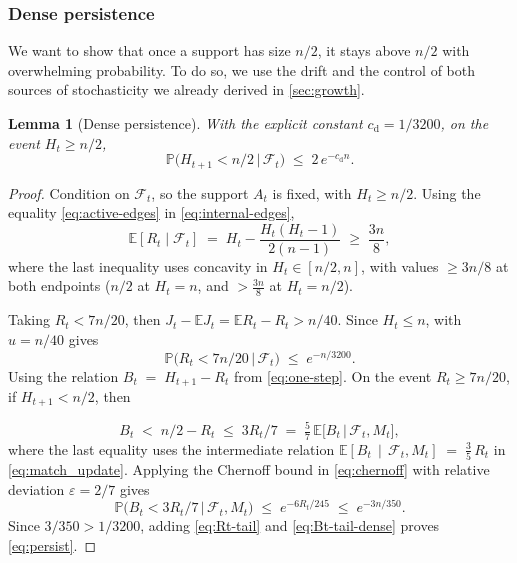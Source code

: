 \documentclass[
    aps,
    superscriptaddress,
    onecolumn,
    10pt,
    prx,
    nofootinbib
]{revtex4-2}
\newtheorem{lemma}{Lemma}
\theoremstyle{namedstatement}
\theoremstyle{plain}
\begin{document}
\subsubsection{Dense persistence}
We want to show that once a support has size $n/2$, it stays above $n/2$ with overwhelming probability. To do so, we use the drift and the control of both sources of stochasticity we already derived in \cref{sec:growth}.
\begin{lemma}[Dense persistence]\label{lem:dense-persistence}
With the explicit constant $c_{\mathrm d}=1/3200$, on the event $H_t\ge n/2$,
\begin{equation}\label{eq:persist}
  \mathbb P\big(H_{t+1}<n/2\,\big|\,\mathcal F_t\big)\;\le\;2\,e^{-c_{\mathrm d}n}.
\end{equation}
\end{lemma}

\begin{proof}
Condition on $\mathcal F_t$, so the support $A_t$ is fixed, with $H_t\ge n/2$. Using the equality \cref{eq:active-edges} in \cref{eq:internal-edges},
\begin{equation}\label{eq:ER-dense}
  \mathbb E[R_t\mid\mathcal F_t]\;=\;H_t-\frac{H_t(H_t-1)}{2(n-1)}\;\ge\;\frac{3n}{8},
\end{equation}
where the last inequality uses concavity in $H_t\in[n/2,n]$, with values $\ge 3n/8$ at
both endpoints ($n/2$ at $H_t=n$, and $>\tfrac{3n}{8}$ at $H_t=n/2$).

Taking $R_t<7n/20$, then $J_t-\mathbb EJ_t=\mathbb ER_t-R_t>n/40$. Since $H_t\le n$,
 with $u=n/40$ gives 
\begin{equation}\label{eq:Rt-tail}
  \mathbb P\big(R_t<7n/20\,\big|\,\mathcal F_t\big)\;\le\;e^{-n/3200}.
\end{equation}
Using the relation  $B_t \;=\; H_{t+1}-R_t$ from \cref{eq:one-step}. On the event $R_t\ge7n/20$, if  $H_{t+1}<n/2$, then

\begin{equation}
  B_t\;<\;n/2-R_t\;\le\;3R_t/7\;=\;\tfrac57\,\mathbb E\big[B_t\,\big|\,\mathcal F_t,M_t\big],
\end{equation}
where the last equality uses the intermediate relation $\mathbb{E}\!\left[ B_t \,\middle|\, \mathcal{F}_t, M_t \right]\;=\; \tfrac{3}{5}\, R_t$ in \cref{eq:match_update}. Applying the Chernoff bound in \cref{eq:chernoff} with relative deviation $\varepsilon=2/7$ gives
\begin{equation}\label{eq:Bt-tail-dense}
  \mathbb P\big(B_t<3R_t/7\,\big|\,\mathcal F_t,M_t\big)
  \;\le\;e^{-6R_t/245}\;\le\;e^{-3n/350}.
\end{equation}
Since $3/350>1/3200$, adding \cref{eq:Rt-tail} and \cref{eq:Bt-tail-dense}
proves \cref{eq:persist}.
\end{proof}
\end{document}
